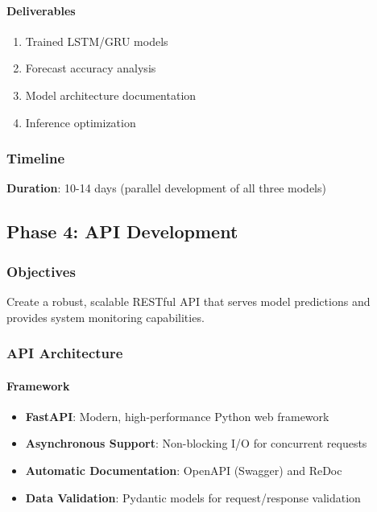 \documentclass[12pt,a4paper]{article}
\begin{document}
\paragraph{Deliverables}
\begin{enumerate}
    \item Trained LSTM/GRU models
    \item Forecast accuracy analysis
    \item Model architecture documentation
    \item Inference optimization
\end{enumerate}

\subsubsection{Timeline}
\textbf{Duration}: 10-14 days (parallel development of all three models)

\newpage

\subsection{Phase 4: API Development}

\subsubsection{Objectives}
Create a robust, scalable RESTful API that serves model predictions and provides system monitoring capabilities.

\subsubsection{API Architecture}

\paragraph{Framework}
\begin{itemize}[leftmargin=*]
    \item \textbf{FastAPI}: Modern, high-performance Python web framework
    \item \textbf{Asynchronous Support}: Non-blocking I/O for concurrent requests
    \item \textbf{Automatic Documentation}: OpenAPI (Swagger) and ReDoc
    \item \textbf{Data Validation}: Pydantic models for request/response validation
\end{itemize}
\end{document}
